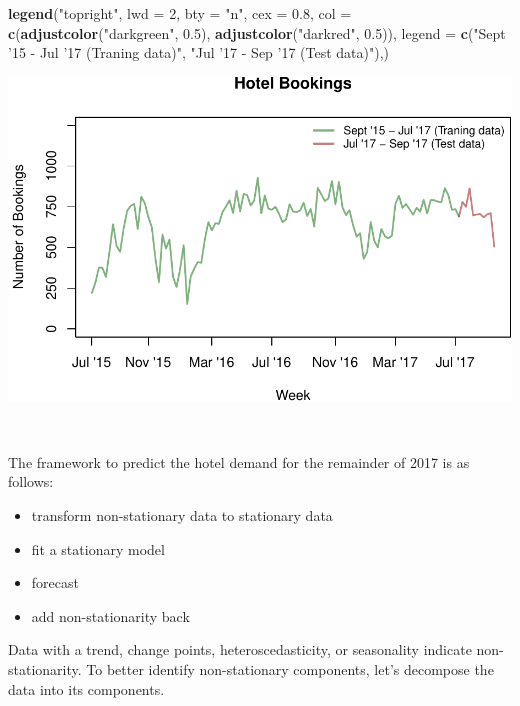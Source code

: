 \documentclass[]{article}
\newenvironment{Shaded}{\begin{snugshade}}{\end{snugshade}}
\newcommand{\DataTypeTok}[1]{\textcolor[rgb]{0.13,0.29,0.53}{#1}}
\newcommand{\DecValTok}[1]{\textcolor[rgb]{0.00,0.00,0.81}{#1}}
\newcommand{\FloatTok}[1]{\textcolor[rgb]{0.00,0.00,0.81}{#1}}
\newcommand{\KeywordTok}[1]{\textcolor[rgb]{0.13,0.29,0.53}{\textbf{#1}}}
\newcommand{\NormalTok}[1]{#1}
\newcommand{\StringTok}[1]{\textcolor[rgb]{0.31,0.60,0.02}{#1}}
\providecommand{\tightlist}{%
  \setlength{\itemsep}{0pt}\setlength{\parskip}{0pt}}
\begin{document}
\begin{Shaded}
\begin{Highlighting}[]
\KeywordTok{legend}\NormalTok{(}\StringTok{"topright"}\NormalTok{,}
       \DataTypeTok{lwd =} \DecValTok{2}\NormalTok{,}
       \DataTypeTok{bty =} \StringTok{"n"}\NormalTok{,}
       \DataTypeTok{cex =} \FloatTok{0.8}\NormalTok{,}
       \DataTypeTok{col =} \KeywordTok{c}\NormalTok{(}\KeywordTok{adjustcolor}\NormalTok{(}\StringTok{"darkgreen"}\NormalTok{, }\FloatTok{0.5}\NormalTok{), }\KeywordTok{adjustcolor}\NormalTok{(}\StringTok{"darkred"}\NormalTok{, }\FloatTok{0.5}\NormalTok{)),}
       \DataTypeTok{legend =} \KeywordTok{c}\NormalTok{(}\StringTok{"Sept '15 - Jul '17 (Traning data)"}\NormalTok{, }\StringTok{"Jul '17 - Sep '17 (Test data)"}\NormalTok{),)}
\end{Highlighting}
\end{Shaded}

\begin{center}\includegraphics{bookings_forecast_files/figure-latex/unnamed-chunk-3-1} \end{center}

\(\;\)

The framework to predict the hotel demand for the remainder of 2017 is
as follows:

\begin{itemize}
\tightlist
\item
  transform non-stationary data to stationary data
\item
  fit a stationary model
\item
  forecast
\item
  add non-stationarity back
\end{itemize}

Data with a trend, change points, heteroscedasticity, or seasonality
indicate non-stationarity. To better identify non-stationary components,
let's decompose the data into its components.
\end{document}
